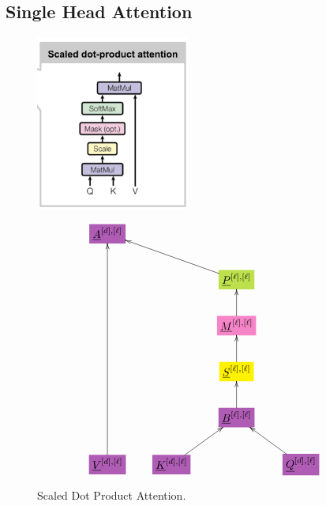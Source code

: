 \subsection{Single Head Attention}
\begin{figure}[h!]\centering
\begin{minipage}{.5\linewidth}
\includegraphics[width=2in]{transformer/scaled-dot-prod-att.jpg}
\end{minipage}%
\begin{minipage}{.5\linewidth}
$$\xymatrix{
*+[F*:Orchid]{\underline{A}^{[d], [\ell]}}&&&
\\
&&*+[F*:SpringGreen]{\underline{P}^{[\ell], [\ell]}}\ar[ull]&
\\
&&*+[F*:Lavender]{\underline{M}^{[\ell], [\ell]}}\ar[u]&
\\
&&*+[F*:yellow]{\underline{S}^{[\ell],[\ell]}}\ar[u]&
\\
&&*+[F*:Orchid]{\underline{B}^{[\ell], [\ell]}}\ar[u]&
\\
*+[F*:Orchid]{\underline{V}^{[d],[\ell]}}\ar[uuuuu]&*+[F*:Orchid]{\underline{K}^{[d],[\ell]}}\ar[ur]&&*+[F*:Orchid]{\underline{Q}^{[d],[\ell]}}\ar[ul]
}$$
\end{minipage}
\caption{Scaled Dot Product Attention.}
\label{fig-texnn-for-scaled-dot-prod-att}
\end{figure}

